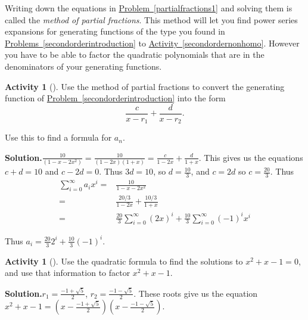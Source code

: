 \documentclass[10pt,]{book}
\theoremstyle{plain}
\theoremstyle{definition}
\newtheorem{activity}[project]{Activity}
\numberwithin{equation}{chapter}
\newcommand{\amp}{&}
\begin{document}
Writing down the equations in \hyperref[partialfractions1]{Problem~\ref{partialfractions1}} and solving them is called the \emph{method of partial fractions}. This method will let you find power series expansions for generating functions of the type you found in \hyperref[secondorderintroduction]{Problems~\ref{secondorderintroduction}} to \hyperref[secondordernonhomo]{Activity~\ref{secondordernonhomo}}. However you have to be able to factor the quadratic polynomials that are in the denominators of your generating functions.%
\begin{activity}[]\label{activity-191}
Use the method of partial fractions to convert the generating function of \hyperref[secondorderintroduction]{Problem~\ref{secondorderintroduction}} into the form%
\begin{equation*}
\frac{c}{x-r_1} + \frac{d}{x-r_2}.
\end{equation*}
%
\par
Use this to find a formula for \(a_n\).%
\par\medskip\noindent%
\textbf{Solution.}\quad \(\frac{10}{(1-x-2x^2)}=\frac{10}{(1-2x)(1+x)} = \frac{c}{1-2x} +\frac{d}{1+x}\). This gives us the equations \(c+d=10\) and \(c-2d=0\). Thus \(3d=10\), so \(d=\frac{10}{3}\), and \(c=2d\) so \(c=\frac{20}{3}\). Thus%
\begin{align*}
\sum_{i=0}^\infty a_ix^i  =\amp  \frac{10}{1-x-2x^2}\\
=\amp \frac{20/3}{1-2x} + \frac{10/3}{1+x}\\
=\amp \frac{20}{3}\sum_{i=0}^\infty (2x)^i + \frac{10}{3}\sum_{i=0}^\infty (-1)^ix^i
\end{align*}
%
\par
Thus \(a_i=\frac{20}{3}2^i +\frac{10}{3}(-1)^i\).%
\end{activity}
\begin{activity}[]\label{factorFibonacci}
Use the quadratic formula to find the solutions to \(x^2+x-1=0\), and use that information to factor \(x^2+x-1\).%
\par\medskip\noindent%
\textbf{Solution.}\quad \(r_1=\frac{-1+\sqrt{5}}{2}\), \(r_2 = \frac{-1-\sqrt{5}}{2}\). These roots give us the equation \(x^2+x-1=(x-\frac{-1+\sqrt{5}}{2})(x-\frac{-1-\sqrt{5}}{2})\).%
\end{activity}
\end{document}
